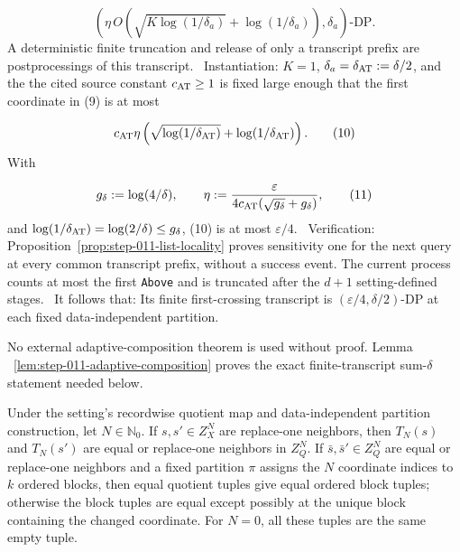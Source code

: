   \[
    \left(
      \eta\,O\!\left(
        \sqrt{K\log(1/\delta_a)}+\log(1/\delta_a)
      \right),
      \delta_a
    \right)\text{-DP}.
    \tag{9}
  \]
  A deterministic finite truncation and release of only a transcript prefix
  are postprocessings of this transcript.
\noindent\textbullet\ Instantiation: \(K=1\), \(\delta_a=\delta_{\rm AT}:=\delta/2\), and the
  the cited source constant \(c_{\rm AT}\geq1\) is fixed large enough that
  the first coordinate in (9) is at most

  \[
    c_{\rm AT}\eta
    \left(\sqrt{\log(1/\delta_{\rm AT})}
          +\log(1/\delta_{\rm AT})\right).
    \tag{10}
  \]
  With

  \[
    g_\delta:=\log(4/\delta),
    \qquad
    \eta:=\frac{\varepsilon}
      {4c_{\rm AT}(\sqrt{g_\delta}+g_\delta)},
    \tag{11}
  \]
  and
  \(\log(1/\delta_{\rm AT})=\log(2/\delta)\leq g_\delta\), (10) is at most
  \(\varepsilon/4\).
\noindent\textbullet\ Verification: Proposition~\ref{prop:step-011-list-locality}
  proves sensitivity one for the next query at every common transcript
  prefix, without a success event. The current process counts at most the
  first \texttt{Above} and is truncated after the \(d+1\) setting-defined stages.
\noindent\textbullet\ It follows that: Its finite first-crossing transcript is
  \((\varepsilon/4,\delta/2)\)-DP at each fixed data-independent partition.

No external adaptive-composition theorem is used without proof. Lemma
~\ref{lem:step-011-adaptive-composition} proves the exact finite-transcript
sum-\(\delta\) statement needed below.



\begin{lemma}\label{lem:step-011-record-locality}
Under the setting's recordwise quotient map and data-independent partition
construction, let \(N\in\mathbb N_0\). If \(s,s'\in Z_X^N\) are replace-one
neighbors, then \(T_N(s)\) and \(T_N(s')\) are equal or replace-one neighbors
in \(Z_Q^N\). If \(\bar s,\bar s'\in Z_Q^N\) are equal or replace-one
neighbors and a fixed partition \(\pi\) assigns the \(N\) coordinate indices
to \(k\) ordered blocks, then equal quotient tuples give equal ordered block
tuples; otherwise the block tuples are equal except possibly at the unique
block containing the changed coordinate. For \(N=0\), all these tuples are
the same empty tuple.


\end{lemma}

